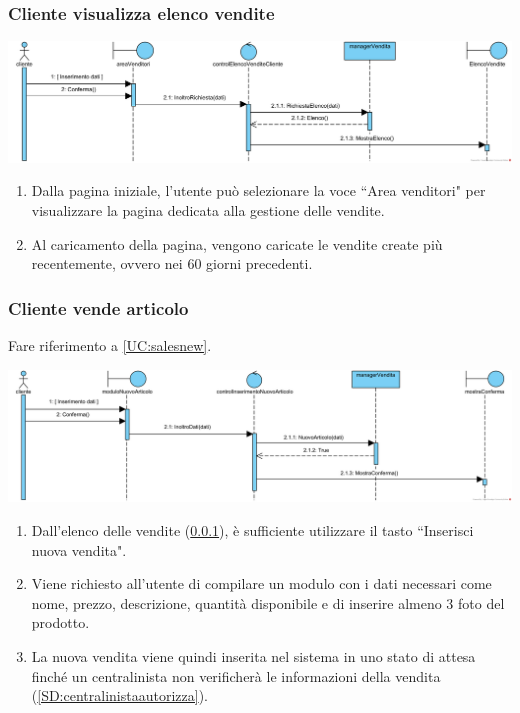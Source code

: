 \documentclass[12pt]{article}
\begin{document}
\newpage

\subsubsection{Cliente visualizza elenco vendite}
\label{SD:elencovendite}

\begin{center}
\includegraphics[width=\textwidth]{SequenceDiagram/ClienteVenditaRicerca}
\end{center}

\begin{enumerate}
\item Dalla pagina iniziale, l'utente può selezionare la voce ``Area venditori" per visualizzare la pagina dedicata alla gestione delle vendite.
\item Al caricamento della pagina, vengono caricate le vendite create più recentemente, ovvero nei 60 giorni precedenti.
\end{enumerate}

\subsubsection{Cliente vende articolo}
\label{SD:creazionevendita}

Fare riferimento a \ref{UC:salesnew}. \\

\begin{center}
\includegraphics[width=\textwidth]{SequenceDiagram/ClienteVenditaCrea}
\end{center}

\begin{enumerate}
\item Dall'elenco delle vendite (\ref{SD:elencovendite}), è sufficiente utilizzare il tasto ``Inserisci nuova vendita".
\item Viene richiesto all'utente di compilare un modulo con i dati necessari come nome, prezzo, descrizione, quantità disponibile e di inserire almeno 3 foto del prodotto.
\item La nuova vendita viene quindi inserita nel sistema in uno stato di attesa finché un centralinista non verificherà le informazioni della vendita (\ref{SD:centralinistaautorizza}).
\end{enumerate}
\end{document}
